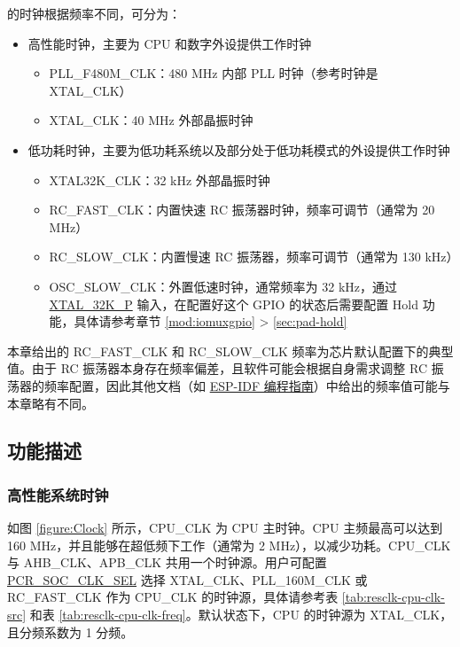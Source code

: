 \documentclass[main\_\_CN.tex]{subfiles}
\begin{document}
\chipname{} 的时钟根据频率不同，可分为：
\begin{itemize}
    \item 高性能时钟，主要为 CPU 和数字外设提供工作时钟
    \begin{itemize}
        \item PLL\_F480M\_CLK：480 MHz 内部 PLL 时钟（参考时钟是 XTAL\_CLK）
        \item XTAL\_CLK：40 MHz 外部晶振时钟
    \end{itemize}
    \item 低功耗时钟，主要为低功耗系统以及部分处于低功耗模式的外设提供工作时钟
    \begin{itemize}
        \item XTAL32K\_CLK：32 kHz 外部晶振时钟
	    \item RC\_FAST\_CLK：内置快速 RC 振荡器时钟，频率可调节（通常为 20 MHz）
	    \item RC\_SLOW\_CLK：内置慢速 RC 振荡器，频率可调节（通常为 130 kHz）
	    \item OSC\_SLOW\_CLK：外置低速时钟，通常频率为 32 kHz，通过 \hyperref[tab:ANA-IO-MUX-CN]{XTAL\_32K\_P} 输入，在配置好这个 GPIO 的状态后需要配置 Hold 功能，具体请参考章节 \ref{mod:iomuxgpio} \textit{} > \ref{sec:pad-hold} \textit{}
    \end{itemize}
\end{itemize}

\begin{tiplisting}
本章给出的 RC\_FAST\_CLK 和 RC\_SLOW\_CLK 频率为芯片默认配置下的典型值。由于 RC 振荡器本身存在频率偏差，且软件可能会根据自身需求调整 RC 振荡器的频率配置，因此其他文档（如 \href{https://docs.espressif.com/projects/esp-idf/zh_CN/latest/esp32c61/api-reference/peripherals/clk_tree.html}{ESP-IDF 编程指南}）中给出的频率值可能与本章略有不同。
\end{tiplisting}

\subsection{功能描述}

\subsubsection{高性能系统时钟}

如图 \ref{figure:Clock} 所示，CPU\_CLK 为 CPU 主时钟。CPU 主频最高可以达到 160 MHz，并且能够在超低频下工作（通常为 2 MHz），以减少功耗。CPU\_CLK 与 AHB\_CLK、APB\_CLK 共用一个时钟源。用户可配置 \hyperref[fielddesc:PCRSOCCLKSEL]{PCR\_SOC\_CLK\_SEL} 选择 XTAL\_CLK、PLL\_160M\_CLK 或 RC\_FAST\_CLK 作为 CPU\_CLK 的时钟源，具体请参考表 \ref{tab:resclk-cpu-clk-src} 和表 \ref{tab:resclk-cpu-clk-freq}。默认状态下，CPU 的时钟源为 XTAL\_CLK，且分频系数为 1 分频。
\end{document}
